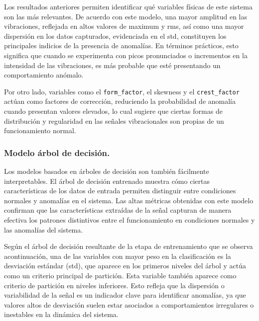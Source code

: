 \documentclass[11pt,a4paper,spanish]{book}
\numberwithin{equation}{chapter}
\numberwithin{figure}{chapter}
\begin{document}
Los resultados anteriores permiten identificar qué variables físicas de este sistema son 
las más relevantes. De acuerdo con este modelo, una mayor amplitud en las vibraciones, 
reflejada en altos valores de maximum y rms, así como una mayor dispersión en los datos 
capturados, evidenciada en el std, constituyen los principales indicios de la presencia 
de anomalías. En términos prácticos, esto significa que cuando se experimenta con picos 
pronunciados o incrementos en la intensidad de las vibraciones, es más probable que esté 
presentando un comportamiento anómalo.


Por otro lado, variables como el \lstinline|form_factor|, el skewness y el 
\lstinline|crest_factor| actúan como factores de corrección, reduciendo la probabilidad 
de anomalía cuando presentan valores elevados, lo cual sugiere que ciertas formas de 
distribución y regularidad en las señales vibracionales son propias de un funcionamiento 
normal. 



\subsubsection{Modelo árbol de decisión.}

Los modelos basados en árboles de decisión son también fácilmente interpretables. 
El árbol de decisión entrenado muestra cómo ciertas características de los datos de 
entrada permiten distinguir entre condiciones normales y anomalías en el sistema. 
Las altas métricas obtenidas con este modelo confirman que las características extraídas 
de la señal capturan de manera efectiva los patrones distintivos entre el funcionamiento 
en condiciones normales y las anomalías del sistema.


Según el árbol de decisión resultante de la etapa de entrenamiento que se observa 
acontinuación, una de las variables con mayor peso en la clasificación es la desviación 
estándar (std), que aparece en los primeros niveles del árbol y actúa como un criterio 
principal de partición. Esta variable también aparece como criterio de partición en 
niveles inferiores. Esto refleja que la dispersión o variabilidad de la señal es un 
indicador clave para identificar anomalías, ya que valores altos de desviación suelen 
estar asociados a comportamientos irregulares o inestables en la dinámica del sistema.
\end{document}
